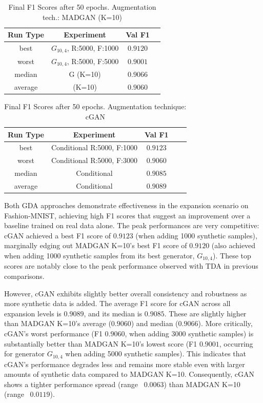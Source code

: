 \begin{table}[H]
	\vspace{-1.5em}
	\centering
	\begin{tabular}{|c|c|c|c|}
		\hline
		Run Type & Experiment & Val F1 \\ \hline
		best & \(G_{10, 4}\), R:5000, F:1000 & $0.9120$\\ \hline
		worst & \(G_{10, 4}\), R:5000, F:5000 & $0.9001$\\ \hline
		median & G (K=10) & $0.9066$\\ \hline
		average & (K=10) & $0.9060$
		\\ \hline
	\end{tabular}
    \caption{Final F1 Scores after 50 epochs. Augmentation tech.: MADGAN (K=10)}
        \label{tab:res_expansion_fashion_cgan_vs_madgan__madgan}
\end{table}
\begin{table}[H]
	\centering
	\vspace{-1.5em}
	\begin{tabular}{|c|c|c|c|c|}
		\hline
		Run Type & Experiment & Val F1 \\ \hline
		best & Conditional R:5000, F:1000 & $0.9123$\\ \hline
		worst & Conditional R:5000, F:3000 & $0.9060$\\ \hline
		median & Conditional & $0.9085$\\ \hline
		average & Conditional & $0.9089$
		\\ \hline
	\end{tabular}
    \caption{Final F1 Scores after 50 epochs. Augmentation technique: cGAN}
        \label{tab:res_expansion_fashion_cgan_vs_madgan__cgan}
\end{table}

Both GDA approaches demonstrate effectiveness in the expansion scenario on Fashion-MNIST, achieving high F1 scores that suggest an improvement over a baseline trained on real data alone. The peak performances are very competitive: cGAN achieved a best F1 score of $0.9123$ (when adding 1000 synthetic samples), marginally edging out MADGAN K=10's best F1 score of $0.9120$ (also achieved when adding 1000 synthetic samples from its best generator, \(G_{10,4}\)). These top scores are notably close to the peak performance observed with TDA in previous comparisons.

However, cGAN exhibits slightly better overall consistency and robustness as more synthetic data is added. The average F1 score for cGAN across all expansion levels is $0.9089$, and its median is $0.9085$. These are slightly higher than MADGAN K=10's average ($0.9060$) and median ($0.9066$). More critically, cGAN's worst performance (F1 $0.9060$, when adding 3000 synthetic samples) is substantially better than MADGAN K=10's lowest score (F1 $0.9001$, occurring for generator \(G_{10,4}\) when adding 5000 synthetic samples). This indicates that cGAN's performance degrades less and remains more stable even with larger amounts of synthetic data compared to MADGAN K=10. Consequently, cGAN shows a tighter performance spread (range ~$0.0063$) than MADGAN K=10 (range ~$0.0119$).

